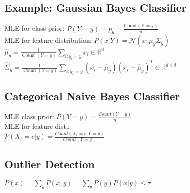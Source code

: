 %
\subsection*{Example: Gaussian Bayes Classifier}
MLE for class prior: $P(Y=y) = p_y = \frac{\operatorname{Count(Y = y)}}{n}$\\
MLE for feature distribution: $P(x|Y) = \mathcal{N}(x ; \mu_y \Sigma_y)$
$\hat{\mu}_{y} = \frac{1}{\operatorname{Count}(Y=y)} \sum_{i:y_i=y} x_i \in \mathbb{R}^d$\\
$\hat{\Sigma}_{y} = \frac{1}{\operatorname{Count}(Y=y)} \sum_{i:y_i=y} (x_i - \hat{\mu}_{y})(x_i-\hat{\mu}_y)^T \in \mathbb{R}^{d \times d}$\\

\subsection*{Categorical Naive Bayes Classifier}
MLE class prior: $P(Y=y) = \frac{Count(Y=y)}{n}$\\
MLE for feature dist.:\\
$P(X_i = c|y) = \frac{Count(X_i = c, Y = y)}{Count(Y=y)}$


\subsection*{Outlier Detection}
$P(x) = \sum_y P(x,y) = \sum_y P(y)P(x|y) \leq \tau$
